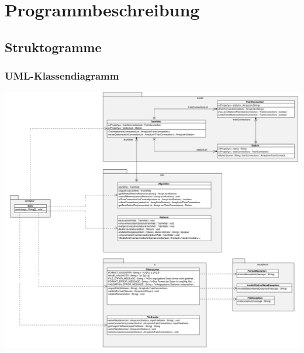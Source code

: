 \chapter{Programmbeschreibung}\label{pro:ch:programmbeschreibung}

\section{Struktogramme}\label{pro:sec:pap}

\subsection{UML-Klassendiagramm}\label{pro:subsec:uml-klassendiagramm}
\begin{center}
    \includegraphics[width=\linewidth]{images/Struktogramme/UML-Klassendiagramm.png}
    \label{pro:subsecpar:uml-klassendiagramm}
\end{center}


